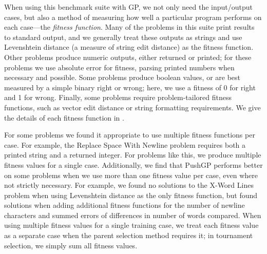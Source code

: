 \documentclass{sig-alternate}
\begin{document}
When using this benchmark suite with GP, we not only need the input/output cases, but also a method of measuring how well a particular program performs on each case---the \textit{fitness function}. 
Many of the problems in this suite print results to standard output, and we generally treat these outputs as strings and use Levenshtein distance (a measure of string edit distance) as the fitness function. Other problems produce numeric outputs, either returned or printed; for these problems we use absolute error for fitness, parsing printed numbers when necessary and possible. Some problems produce boolean values, or are best measured by a simple binary right or wrong; here, we use a fitness of 0 for right and 1 for wrong. Finally, some problems require problem-tailored fitness functions, such as vector edit distance or string formatting requirements. We give the details of each fitness function in \cite{helmuth:umass:tr}.

For some problems we found it appropriate to use multiple fitness functions per case. For example, the Replace Space With Newline problem requires both a printed string and a returned integer. For problems like this, we produce multiple fitness values for a single case. Additionally, we find that PushGP performs better on some problems when we use more than one fitness value per case, even where not strictly necessary. For example, we found no solutions to the X-Word Lines problem when using Levenshtein distance as the only fitness function, but found solutions when adding additional fitness functions for the number of newline characters and summed errors of differences in number of words compared. When using multiple fitness values for a single training case, we treat each fitness value as a separate case when the parent selection method requires it; in tournament selection, we simply sum all fitness values.
\end{document}
